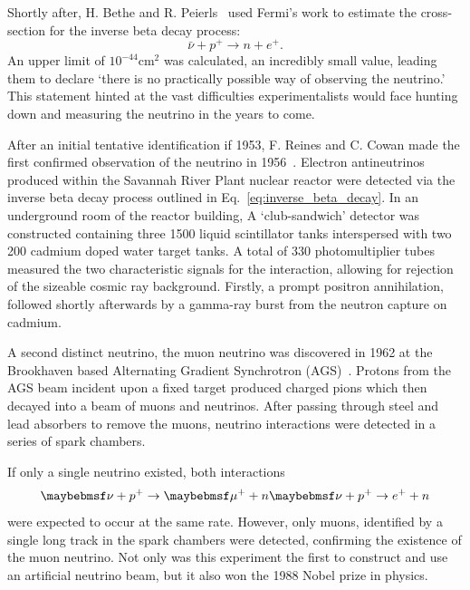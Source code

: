 Shortly after, H. Bethe and R. Peierls~\cite{bethe1934} used Fermi's work to estimate the
cross-section for the inverse beta decay process:
\begin{equation} %
    \bar{\nu} + p^{+} \rightarrow n + e^{+}.
    \label{eq:inverse_beta_decay}
\end{equation}
An upper limit of $10^{-44} \mathrm{cm}^2$ was calculated, an incredibly small value, leading them
to declare `there is no practically possible way of observing the neutrino.' This statement hinted
at the vast difficulties experimentalists would face hunting down and measuring the neutrino in
the years to come.

After an initial tentative identification if 1953, F. Reines and C. Cowan made the first confirmed
observation of the neutrino in 1956~\cite{cowan1956}. Electron antineutrinos produced within the
Savannah River Plant nuclear reactor were detected via the inverse beta decay process outlined in
Eq.~\ref{eq:inverse_beta_decay}. In an underground room of the reactor building, A `club-sandwich'
detector was constructed containing three \unit{1500}{\litre} liquid scintillator tanks
interspersed with two \unit{200}{\litre} cadmium doped water target tanks. A total of 330
photomultiplier tubes measured the two characteristic signals for the interaction, allowing for
rejection of the sizeable cosmic ray background. Firstly, a prompt positron annihilation, followed
shortly afterwards by a gamma-ray burst from the neutron capture on cadmium.

A second distinct neutrino, the muon neutrino was discovered in 1962 at the Brookhaven based
Alternating Gradient Synchrotron (AGS)~\cite{danby1962}. Protons from the AGS beam incident upon a
fixed target produced charged pions which then decayed into a beam of muons and neutrinos. After
passing through steel and lead absorbers to remove the muons, neutrino interactions were detected
in a series of spark chambers.

If only a single neutrino existed, both interactions
\begin{equation} %
    \nu+p^{+}\rightarrow\mu^{+}+n \\
    \nu+p^{+}\rightarrow e^{+}+n
\end{equation}
were expected to occur at the same rate. However, only muons, identified by a single long track in
the spark chambers were detected, confirming the existence of the muon neutrino. Not only was this
experiment the first to construct and use an artificial neutrino beam, but it also won the 1988
Nobel prize in physics.

